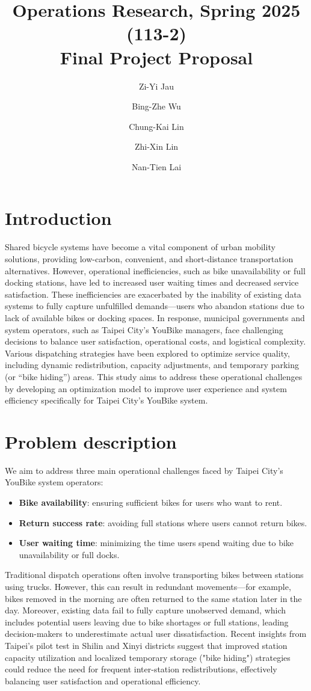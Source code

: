 \documentclass[11pt,a4paper]{article}
\title{Operations Research, Spring 2025 (113-2) \\ Final Project Proposal}
\author{Zi-Yi Jau} %
\author{Bing-Zhe Wu} %
\author{Chung-Kai Lin} %
\author{Zhi-Xin Lin} %
\author{Nan-Tien Lai} %
\affil{Department of Information Management, National Taiwan University}
\begin{document}
\maketitle

\section{Introduction}

Shared bicycle systems have become a vital component of urban mobility solutions, providing low-carbon, convenient, and short-distance transportation alternatives. However, operational inefficiencies, such as bike unavailability or full docking stations, have led to increased user waiting times and decreased service satisfaction. These inefficiencies are exacerbated by the inability of existing data systems to fully capture unfulfilled demands—users who abandon stations due to lack of available bikes or docking spaces. In response, municipal governments and system operators, such as Taipei City's YouBike managers, face challenging decisions to balance user satisfaction, operational costs, and logistical complexity. Various dispatching strategies have been explored to optimize service quality, including dynamic redistribution, capacity adjustments, and temporary parking (or ``bike hiding'') areas. This study aims to address these operational challenges by developing an optimization model to improve user experience and system efficiency specifically for Taipei City's YouBike system.

\section{Problem description}

We aim to address three main operational challenges faced by Taipei City's YouBike system operators:
\begin{itemize}
    \item \textbf{Bike availability}: ensuring sufficient bikes for users who want to rent.
    \item \textbf{Return success rate}: avoiding full stations where users cannot return bikes.
    \item \textbf{User waiting time}: minimizing the time users spend waiting due to bike unavailability or full docks.
\end{itemize}

Traditional dispatch operations often involve transporting bikes between stations using trucks. However, this can result in redundant movements—for example, bikes removed in the morning are often returned to the same station later in the day. Moreover, existing data fail to fully capture unobserved demand, which includes potential users leaving due to bike shortages or full stations, leading decision-makers to underestimate actual user dissatisfaction. Recent insights from Taipei’s pilot test in Shilin and Xinyi districts suggest that improved station capacity utilization and localized temporary storage ("bike hiding") strategies could reduce the need for frequent inter-station redistributions, effectively balancing user satisfaction and operational efficiency.
\end{document}

